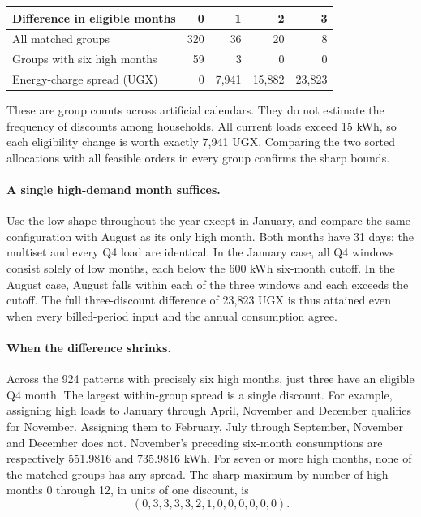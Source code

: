 \documentclass[11pt]{article}
\begin{document}
\begin{center}
\begin{tabular}{lrrrr}
\toprule
Difference in eligible months & 0 & 1 & 2 & 3\\
\midrule
All matched groups & 320 & 36 & 20 & 8\\
Groups with six high months & 59 & 3 & 0 & 0\\
Energy-charge spread (UGX) & 0 & 7,941 & 15,882 & 23,823\\
\bottomrule
\end{tabular}
\end{center}
These are group counts across artificial calendars. They do not estimate the frequency of discounts among households. All current loads exceed 15 kWh, so each eligibility change is worth exactly 7,941 UGX. Comparing the two sorted allocations with all feasible orders in every group confirms the sharp bounds.

\paragraph{A single high-demand month suffices.} Use the low shape throughout the year except in January, and compare the same configuration with August as its only high month. Both months have 31 days; the multiset and every Q4 load are identical. In the January case, all Q4 windows consist solely of low months, each below the 600 kWh six-month cutoff. In the August case, August falls within each of the three windows and each exceeds the cutoff. The full three-discount difference of 23,823 UGX is thus attained even when every billed-period input and the annual consumption agree.

\paragraph{When the difference shrinks.} Across the 924 patterns with precisely six high months, just three have an eligible Q4 month. The largest within-group spread is a single discount. For example, assigning high loads to January through April, November and December qualifies for November. Assigning them to February, July through September, November and December does not. November's preceding six-month consumptions are respectively 551.9816 and 735.9816 kWh. For seven or more high months, none of the matched groups has any spread. The sharp maximum by number of high months 0 through 12, in units of one discount, is
\[
 (0,3,3,3,3,2,1,0,0,0,0,0,0).
\]
\end{document}
